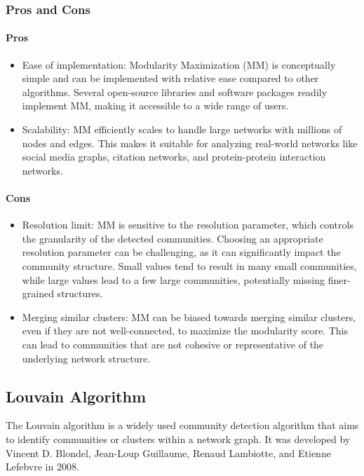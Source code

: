 \pagebreak
\subsubsection{Pros and Cons}
\paragraph{Pros}
\begin{itemize}
    \item Ease of implementation: Modularity Maximization (MM) is conceptually simple and can be implemented with relative ease compared to other algorithms. Several open-source libraries and software packages readily implement MM, making it accessible to a wide range of users.
    \item Scalability: MM efficiently scales to handle large networks with millions of nodes and edges. This makes it suitable for analyzing real-world networks like social media graphs, citation networks, and protein-protein interaction networks.
\end{itemize}
\paragraph{Cons}
\begin{itemize}
    \item Resolution limit: MM is sensitive to the resolution parameter, which controls the granularity of the detected communities. Choosing an appropriate resolution parameter can be challenging, as it can significantly impact the community structure. Small values tend to result in many small communities, while large values lead to a few large communities, potentially missing finer-grained structures.
    \item Merging similar clusters: MM can be biased towards merging similar clusters, even if they are not well-connected, to maximize the modularity score. This can lead to communities that are not cohesive or representative of the underlying network structure.
\end{itemize}

\subsection{Louvain Algorithm}
The Louvain algorithm is a widely used community detection algorithm that aims to identify communities or clusters within a network graph. It was developed by Vincent D. Blondel, Jean-Loup Guillaume, Renaud Lambiotte, and Etienne Lefebvre in 2008.


